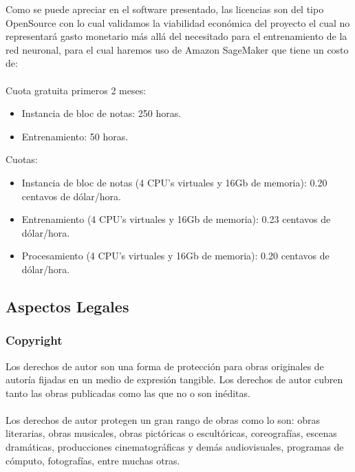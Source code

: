 \documentclass[12pt, a4paper, titlepage]{report}
\begin{document}
    	Como se puede apreciar en el software presentado, las licencias son del tipo OpenSource con lo cual validamos la viabilidad económica del proyecto el cual no representará gasto monetario más allá del necesitado para el entrenamiento de la red neuronal, para el cual haremos uso de Amazon SageMaker que tiene un costo de:\\\\
    	Cuota gratuita primeros 2 meses:
    	\begin{itemize}
    		\item Instancia de bloc de notas: 250 horas.
    		\item Entrenamiento: 50 horas. 
    	\end{itemize}
    	Cuotas:
    	\begin{itemize}
    		\item Instancia de bloc de notas (4 CPU's virtuales y 16Gb de memoria): 0.20 centavos de dólar/hora.
    		\item Entrenamiento (4 CPU's virtuales y 16Gb de memoria): 0.23 centavos de dólar/hora.
    		\item Procesamiento (4 CPU's virtuales y 16Gb de memoria): 0.20 centavos de dólar/hora.
    	\end{itemize}	
    	
    	\subsection{Aspectos Legales}
    	\subsubsection*{Copyright}
    	Los derechos de autor son una forma de protección para obras originales de autoría fijadas en un medio de expresión tangible. Los derechos de autor cubren tanto las obras publicadas como las que no o son inéditas.\cite{refCopyright}\\\\
    	Los derechos de autor protegen un gran rango de obras como lo son: obras literarias, obras musicales, obras pictóricas o escultóricas, coreografías, escenas dramáticas, producciones cinematográficas y demás audiovisuales, programas de cómputo, fotografías, entre muchas otras.
\end{document}
